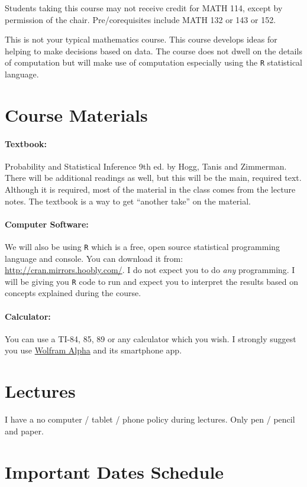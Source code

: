 \documentclass[12pt]{article}
\begin{document}
Students taking this course may not receive credit for MATH 114, except by permission of the chair. Pre/corequisites include MATH 132 or 143 or 152.

This is not your typical mathematics course. This course develops ideas for helping to make decisions based on data. The course does not dwell on the details of computation but will make use of computation especially using the \texttt{R} statistical language.


\section*{Course Materials}

\paragraph{Textbook:} Probability and Statistical Inference 9th ed. by Hogg, Tanis and Zimmerman. There will be additional readings as well, but this will be the main, required text. Although it is required, most of the material in the class comes from the lecture notes. The textbook is a way to get ``another take'' on the material.
\paragraph{Computer Software:} We will also be using \texttt{R} which is a free, open source statistical programming language and console. You can download it from: \url{http://cran.mirrors.hoobly.com/}. I do not expect you to do \textit{any} programming. I will be giving you \texttt{R} code to run and expect you to interpret the results based on concepts explained during the course.
\paragraph{Calculator:} You can use a TI-84, 85, 89 or any calculator which you wish. I strongly suggest you use \href{http://www.wolframalpha.com/}{Wolfram Alpha} and its smartphone app.

\section*{Lectures}

I have a no computer / tablet / phone policy during lectures. Only pen / pencil and paper.

\section*{Important Dates Schedule}
\end{document}
